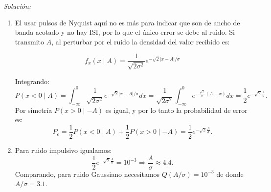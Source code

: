 \documentclass[a4paper,11pt]{article}
\newenvironment{solucion}[1][]{
\noindent \large \textsl{Solución:} \ifthenelse{\equal{#1}{}}{}{\emph{(#1)}}

\smallskip
}{
\bigskip
}
\begin{document}
\begin{solucion}
\begin{enumerate}
\item El usar pulsos de Nyquist aquí no es más para indicar que son de ancho de banda acotado y no hay ISI, por lo que el único error se debe al ruido. Si transmito $A$, al perturbar por el ruido la densidad del valor recibido es:

        \noindent\begin{minipage}{0.4\textwidth}
        \begin{equation*}
        f_x(x\mid A)= \frac{1}{\sqrt{2\sigma^2}} e^{-\sqrt{2}|x-A|/\sigma}
        \end{equation*}
        \end{minipage}%
        \begin{minipage}{0.6\textwidth}
        \begin{center}
        \end{center}
        \end{minipage}
Integrando:
\begin{equation*}
        P(x<0\mid A) = \int_{-\infty}^0 \frac{1}{\sqrt{2\sigma^2}} e^{-\sqrt{2}|x-A|/\sigma} dx = \frac{1}{\sqrt{2\sigma^2}} \int_{-\infty}^0 e^{-\frac{\sqrt{2}}{\sigma} (A-x)}dx = \frac{1}{2} e^{-\sqrt{2}\frac{A}{\sigma}}.
\end{equation*} 
Por simetría $P(x>0\mid -A)$ es igual, y por lo tanto la probabilidad de error es:
\begin{equation*}
        P_e = \frac{1}{2}P(x<0\mid A)+ \frac{1}{2}P(x>0\mid -A) = \frac{1}{2} e^{-\sqrt{2}\frac{A}{\sigma}}.
\end{equation*}

\item Para ruido impulsivo igualamos:
\begin{equation*}
        \frac{1}{2} e^{-\sqrt{2}\frac{A}{\sigma}} = 10^{-3} \Rightarrow \frac{A}{\sigma} \approx 4.4.
\end{equation*}
Comparando, para ruido Gaussiano necesitamos $Q(A/\sigma) = 10^{-3}$ de donde $A/\sigma = 3.1$.

\end{enumerate}

\end{solucion}
\end{document}
